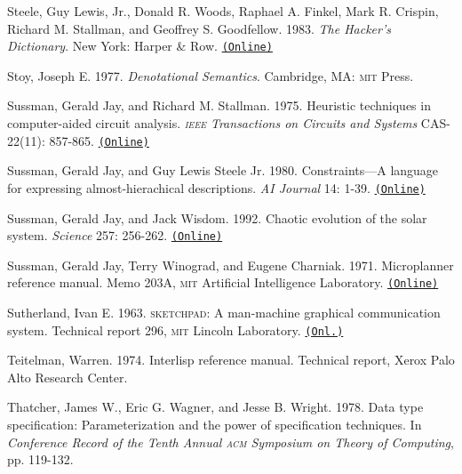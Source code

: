 \documentclass[oneside]{book}
\newcommand{\acronym}[1]{\textsc{\MakeLowercase{#1}}}
\newcommand{\code}[1]{\texttt{#1}}
\begin{document}
 \label{Steele et al. 1983}
Steele, Guy Lewis, Jr., Donald R. Woods, Raphael A. Finkel, Mark R.  Crispin,
Richard M. Stallman, and Geoffrey S. Goodfellow.  1983.  \textit{The Hacker's
Dictionary}. New York: Harper \& Row.
\href{http://www.dourish.com/goodies/jargon.html}{\code{(Online)}}

 \label{Stoy 1977}
Stoy, Joseph E.  1977.  \textit{Denotational Semantics}. Cambridge, MA:
\acronym{MIT} Press.

 \label{Sussman and Stallman 1975}
Sussman, Gerald Jay, and Richard M. Stallman.  1975.  Heuristic techniques in
computer-aided circuit analysis.  \textit{\acronym{IEEE} Transactions on Circuits
and Systems} CAS-22(11): 857-865.
\href{http://dspace.mit.edu/handle/1721.1/5803}{\code{(Online)}}

 \label{Sussman and Steele 1980}
Sussman, Gerald Jay, and Guy Lewis Steele Jr.  1980.  Constraints---A language
for expressing almost-hierachical descriptions.  \textit{AI Journal} 14: 1-39.
\href{http://dspace.mit.edu/handle/1721.1/6312}{\code{(Online)}}

 \label{Sussman and Wisdom 1992}
Sussman, Gerald Jay, and Jack Wisdom.  1992. Chaotic evolution of the solar
system.  \textit{Science} 257: 256-262.
\href{http://groups.csail.mit.edu/mac/users/wisdom/ss-chaos.pdf}{\code{(Online)}}

 \label{Sussman et al. (1971)}
Sussman, Gerald Jay, Terry Winograd, and Eugene Charniak.  1971.  Microplanner
reference manual.  Memo 203A, \acronym{MIT} Artificial Intelligence Laboratory.
\href{http://dspace.mit.edu/handle/1721.1/6184}{\code{(Online)}}

 \label{Sutherland (1963)}
Sutherland, Ivan E.  1963.  \acronym{SKETCHPAD}: A man-machine graphical
communication system.  Technical report 296, \acronym{MIT} Lincoln Laboratory.
\href{http://citeseer.ist.psu.edu/viewdoc/summary?doi=10.1.1.10.4290}{\code{(Onl.)}}

 \label{Teitelman 1974}
Teitelman, Warren.  1974.  Interlisp reference manual.  Technical report, Xerox
Palo Alto Research Center.

 \label{Thatcher et al. 1978}
Thatcher, James W., Eric G. Wagner, and Jesse B. Wright. 1978.  Data type
specification: Parameterization and the power of specification techniques. In
\textit{Conference Record of the Tenth Annual \acronym{ACM} Symposium on Theory
of Computing}, pp. 119-132.
\end{document}
